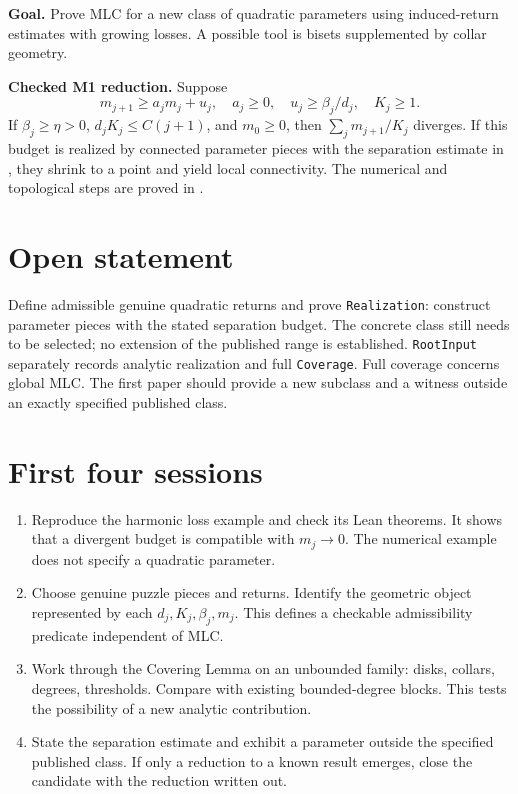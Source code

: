 \noindent\textbf{Goal.} Prove MLC for a new class of quadratic parameters
using induced-return estimates with growing losses. A possible tool is
bisets supplemented by collar geometry.

\textbf{Checked M1 reduction.} Suppose
\[
m_{j+1}\ge a_jm_j+u_j,\quad a_j\ge0,\quad
u_j\ge\beta_j/d_j,\quad K_j\ge1.
\]
If \(\beta_j\ge\eta>0\), \(d_jK_j\le C(j+1)\), and \(m_0\ge0\),
then \(\sum_jm_{j+1}/K_j\) diverges. If this budget is realized by
connected parameter pieces with the separation estimate in
, they shrink to a point and yield local connectivity.
The numerical and topological steps are proved in .

\section{Open statement}
Define admissible genuine quadratic returns and prove \texttt{Realization}:
construct parameter pieces with the stated separation budget.
The concrete class still needs to be selected; no extension of the published
range is established. \texttt{RootInput} separately records analytic
realization and full \texttt{Coverage}. Full coverage concerns global MLC.
The first paper should provide a new subclass and a witness outside an
exactly specified published class.

\section{First four sessions}
\begin{enumerate}
\item Reproduce the harmonic loss example and check its Lean theorems.
It shows that a divergent budget is compatible with \(m_j\to0\).
The numerical example does not specify a quadratic parameter.
\item Choose genuine puzzle pieces and returns. Identify the geometric
object represented by each \(d_j,K_j,\beta_j,m_j\). This defines a
checkable admissibility predicate independent of MLC.
\item Work through the Covering Lemma on an unbounded family: disks,
collars, degrees, thresholds. Compare with existing bounded-degree blocks.
This tests the possibility of a new analytic contribution.
\item State the separation estimate and exhibit a parameter outside the
specified published class. If only a reduction to a known result emerges,
close the candidate with the reduction written out.
\end{enumerate}

